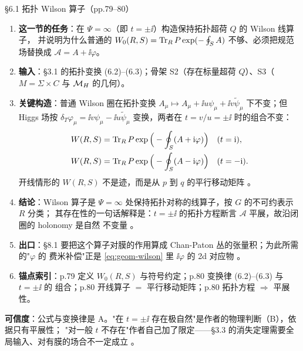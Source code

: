 \begin{kcard}{\S6.1 拓扑 Wilson 算子（pp.79--80）}
\begin{enumerate}[label=\textbf{\arabic*}]
\item \textbf{这一节的任务}：在 $\Psi=\infty$（即 $t=\pm\ii$）构造保持拓扑超荷 $Q$ 的 Wilson 线算子，
  并说明为什么普通的 $W_0(R,S)=\operatorname{Tr}_R P\exp(-\oint_S A)$ 不够、必须把规范场替换成
  $\mathcal A=A+\ii\varphi$。
\item \textbf{输入}：\S3.1 的拓扑变换 (6.2)--(6.3)；骨架 S2（存在标量超荷 $Q$）、S3（$M=\Sigma\times C$
  与 $\mathcal{M}_H$ 的几何）。
\item \textbf{关键构造}：普通 Wilson 圈在拓扑变换 $A_\mu\mapsto A_\mu+\ii u\psi_\mu+\ii v\tilde\psi_\mu$
  下不变；但 Higgs 场按 $\delta_T\varphi_\mu=\ii v\psi_\mu-\ii u\tilde\psi_\mu$ 变换，两者在
  $t=v/u=\pm\ii$ 时的组合不变：
\begin{equation}
\begin{aligned}
W(R,S)&=\operatorname{Tr}_R P\exp\Big(-\oint_S (A+\mathrm{i}\varphi)\Big) &&(t=\mathrm{i}),\\
W(R,S)&=\operatorname{Tr}_R P\exp\Big(-\oint_S (A-\mathrm{i}\varphi)\Big) &&(t=-\mathrm{i}).
\end{aligned}
\label{eq:geom-wilson}
\end{equation}
  开线情形的 $W(R,S)$ 不是迹，而是从 $p$ 到 $q$ 的平行移动矩阵 \pA{}。
\item \textbf{结论}：Wilson 算子是 $\Psi=\infty$ 处保持拓扑对称的线算子，按 $G$ 的不可约表示 $R$ 分类；
  其存在性的一句话解释是：$t=\pm\ii$ 的拓扑方程断言 $\mathcal A$ 平展，故沿闭圈的 holonomy 是自然
  不变量 \pA{}。
\item \textbf{出口}：\S8.1 要把这个算子对膜的作用算成 Chan-Paton 丛的张量积；为此所需的"$\varphi$ 的
  费米补偿"正是 \eqref{eq:geom-wilson} 里 $\ii\varphi$ 的 2d 对应物 \pB{}。
\item \textbf{锚点索引}：p.79 定义 $W_0(R,S)$ 与符号约定；p.80 变换律 (6.2)--(6.3) 与 $t=\pm\ii$ 的
  组合；p.80 开线算子 $=$ 平行移动矩阵；p.80 拓扑方程 $\Rightarrow$ 平展性。
\end{enumerate}
\textbf{可信度}：公式与变换律是 A。"在 $t=\pm\ii$ 存在极自然"是作者的物理判断（B），依据只有平展性；
"对一般 $t$ 不存在"作者自己加了限定——\S3.3 的消失定理需要全局输入、对有膜的场合不一定成立
\pB{}。
\end{kcard}

